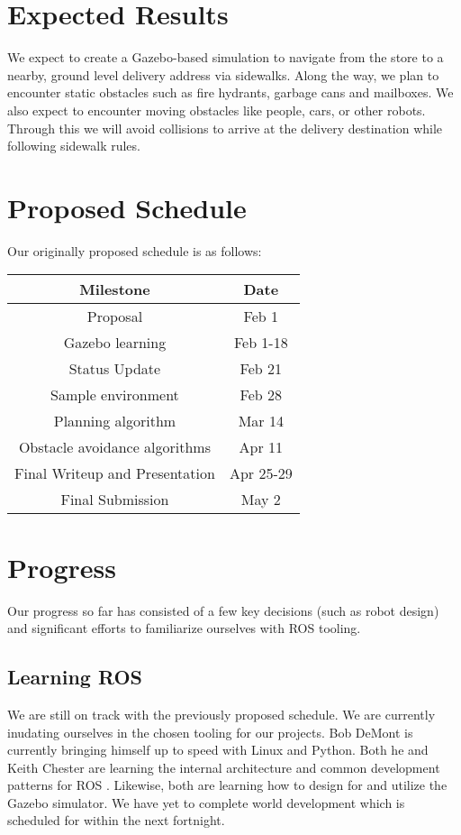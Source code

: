 \documentclass{article}
\begin{document}
\begin{multicols}{2}
\section*{Expected Results}
We expect to create a Gazebo-based simulation to navigate from the store to a nearby, ground level delivery address via sidewalks.  Along the way, we plan to encounter static obstacles such as fire hydrants, garbage cans and mailboxes.  We also expect to encounter moving obstacles like people, cars, or other robots.  Through this we will avoid collisions to arrive at the delivery destination while following sidewalk rules.

\section*{Proposed Schedule}
Our originally proposed schedule is as follows:

\begin{center}
\begin{tabular}{|cc|}
\hline
Milestone & Date  \\
\hline
Proposal  &  Feb 1 \\
Gazebo learning  &  Feb 1-18 \\
Status Update  &  Feb 21 \\
Sample environment & Feb 28\\
Planning algorithm & Mar 14\\
Obstacle avoidance algorithms & Apr 11\\
Final Writeup and Presentation & Apr 25-29\\
Final Submission  &  May 2 \\
\hline
\end{tabular}
\end{center}

\section*{Progress}

Our progress so far has consisted of a few key decisions (such as robot design) and significant efforts to familiarize ourselves with ROS tooling.

\subsection*{Learning ROS}

We are still on track with the previously proposed schedule. We are currently inudating ourselves in the chosen tooling for our projects. Bob DeMont is currently bringing himself up to speed with Linux and Python. Both he and Keith Chester are learning the internal architecture and common development patterns for ROS \cite{Construct}. Likewise, both are learning how to design for and utilize the Gazebo simulator. We have yet to complete world development which is scheduled for within the next fortnight.


\end{multicols}
\end{document}
